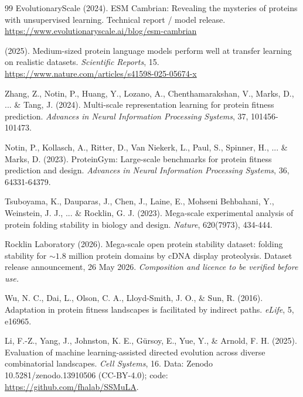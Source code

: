 \documentclass[12pt, a4paper]{article}
\begin{document}
\begin{thebibliography}{99}
EvolutionaryScale (2024). \newblock ESM Cambrian: Revealing the mysteries of proteins with unsupervised learning. \newblock Technical report / model release. \url{https://www.evolutionaryscale.ai/blog/esm-cambrian}


(2025). \newblock Medium-sized protein language models perform well at transfer learning on realistic datasets. \newblock \textit{Scientific Reports}, 15. \url{https://www.nature.com/articles/s41598-025-05674-x}


Zhang, Z., Notin, P., Huang, Y., Lozano, A., Chenthamarakshan, V., Marks, D., ... \& Tang, J. (2024). \newblock Multi-scale representation learning for protein fitness prediction. \newblock \textit{Advances in Neural Information Processing Systems}, 37, 101456-101473.


Notin, P., Kollasch, A., Ritter, D., Van Niekerk, L., Paul, S., Spinner, H., ... \& Marks, D. (2023). \newblock ProteinGym: Large-scale benchmarks for protein fitness prediction and design. \newblock \textit{Advances in Neural Information Processing Systems}, 36, 64331-64379.


Tsuboyama, K., Dauparas, J., Chen, J., Laine, E., Mohseni Behbahani, Y., Weinstein, J. J., ... \& Rocklin, G. J. (2023). \newblock Mega-scale experimental analysis of protein folding stability in biology and design. \newblock \textit{Nature}, 620(7973), 434-444.


Rocklin Laboratory (2026). \newblock Mega-scale open protein stability dataset: folding stability for ${\sim}1.8$ million protein domains by cDNA display proteolysis. \newblock Dataset release announcement, 26 May 2026. \textit{Composition and licence to be verified before use.}


Wu, N. C., Dai, L., Olson, C. A., Lloyd-Smith, J. O., \& Sun, R. (2016). \newblock Adaptation in protein fitness landscapes is facilitated by indirect paths. \newblock \textit{eLife}, 5, e16965.


Li, F.-Z., Yang, J., Johnston, K. E., G\"{u}rsoy, E., Yue, Y., \& Arnold, F. H. (2025). \newblock Evaluation of machine learning-assisted directed evolution across diverse combinatorial landscapes. \newblock \textit{Cell Systems}, 16. \newblock Data: Zenodo 10.5281/zenodo.13910506 (CC-BY-4.0); code: \url{https://github.com/fhalab/SSMuLA}.



\end{thebibliography}
\end{document}
